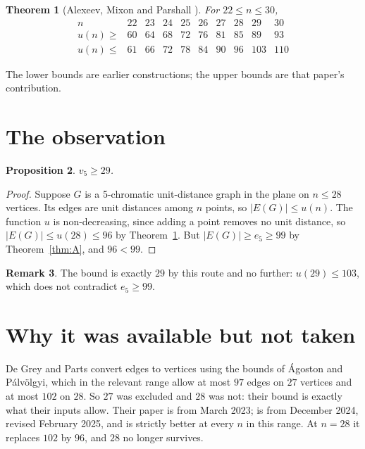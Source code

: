 \documentclass[11pt,reqno]{amsart}
\theoremstyle{plain}
\newtheorem{theorem}{Theorem}
\newtheorem{proposition}[theorem]{Proposition}
\theoremstyle{definition}
\newtheorem{remark}[theorem]{Remark}
\begin{document}
\begin{theorem}[Alexeev, Mixon and Parshall \cite{AMP}]\label{thm:B}
For $22 \le n \le 30$,
\[
\begin{array}{l|ccccccccc}
 n            & 22 & 23 & 24 & 25 & 26 & 27 & 28 & 29 & 30 \\ \hline
 u(n) \ge     & 60 & 64 & 68 & 72 & 76 & 81 & 85 & 89 & 93 \\
 u(n) \le     & 61 & 66 & 72 & 78 & 84 & 90 & 96 & 103 & 110
\end{array}
\]
\end{theorem}

The lower bounds are earlier constructions; the upper bounds are that paper's
contribution.

\section{The observation}

\begin{proposition}\label{prop:29}
$v_5 \ge 29$.
\end{proposition}

\begin{proof}
Suppose $G$ is a 5-chromatic unit-distance graph in the plane on $n \le 28$
vertices. Its edges are unit distances among $n$ points, so $\lvert E(G)\rvert
\le u(n)$. The function $u$ is non-decreasing, since adding a point removes no
unit distance, so $\lvert E(G)\rvert \le u(28) \le 96$ by Theorem~\ref{thm:B}.
But $\lvert E(G)\rvert \ge e_5 \ge 99$ by Theorem~\ref{thm:A}, and $96 < 99$.
\end{proof}

\begin{remark}
The bound is exactly $29$ by this route and no further: $u(29) \le 103$, which
does not contradict $e_5 \ge 99$.
\end{remark}

\section{Why it was available but not taken}

De Grey and Parts convert edges to vertices using the bounds of \'Agoston and
P\'alv\"olgyi, which in the relevant range allow at most $97$ edges on $27$
vertices and at most $102$ on $28$. So $27$ was excluded and $28$ was not: their
bound is exactly what their inputs allow. Their paper is from March 2023;
\cite{AMP} is from December 2024, revised February 2025, and is strictly better
at every $n$ in this range. At $n = 28$ it replaces $102$ by $96$, and $28$ no
longer survives.
\end{document}
